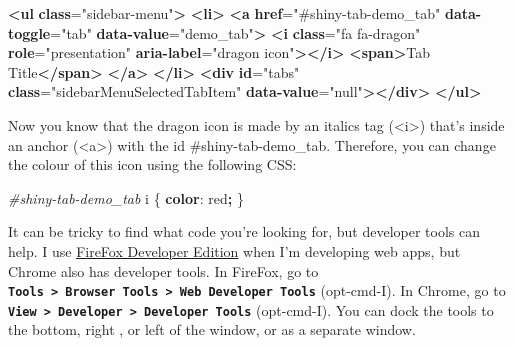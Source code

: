 \documentclass[
  oneside]{book}
\newenvironment{Shaded}{\begin{snugshade}}{\end{snugshade}}
\newcommand{\ConstantTok}[1]{\textcolor[rgb]{0.00,0.00,0.00}{#1}}
\newcommand{\ErrorTok}[1]{\textcolor[rgb]{0.64,0.00,0.00}{\textbf{#1}}}
\newcommand{\KeywordTok}[1]{\textcolor[rgb]{0.13,0.29,0.53}{\textbf{#1}}}
\newcommand{\NormalTok}[1]{#1}
\newcommand{\OperatorTok}[1]{\textcolor[rgb]{0.81,0.36,0.00}{\textbf{#1}}}
\newcommand{\OtherTok}[1]{\textcolor[rgb]{0.56,0.35,0.01}{#1}}
\newcommand{\PreprocessorTok}[1]{\textcolor[rgb]{0.56,0.35,0.01}{\textit{#1}}}
\newcommand{\StringTok}[1]{\textcolor[rgb]{0.31,0.60,0.02}{#1}}
\begin{document}
\begin{Shaded}
\begin{Highlighting}[]
\KeywordTok{\textless{}ul} \ErrorTok{class}\OtherTok{=}\StringTok{"sidebar{-}menu"}\KeywordTok{\textgreater{}}
  \KeywordTok{\textless{}li\textgreater{}}
    \KeywordTok{\textless{}a} \ErrorTok{href}\OtherTok{=}\StringTok{"\#shiny{-}tab{-}demo\_tab"} \ErrorTok{data{-}toggle}\OtherTok{=}\StringTok{"tab"} \ErrorTok{data{-}value}\OtherTok{=}\StringTok{"demo\_tab"}\KeywordTok{\textgreater{}}
      \KeywordTok{\textless{}i} \ErrorTok{class}\OtherTok{=}\StringTok{"fa fa{-}dragon"} \ErrorTok{role}\OtherTok{=}\StringTok{"presentation"} \ErrorTok{aria{-}label}\OtherTok{=}\StringTok{"dragon icon"}\KeywordTok{\textgreater{}\textless{}/i\textgreater{}}
      \KeywordTok{\textless{}span\textgreater{}}\NormalTok{Tab Title}\KeywordTok{\textless{}/span\textgreater{}}
    \KeywordTok{\textless{}/a\textgreater{}}
  \KeywordTok{\textless{}/li\textgreater{}}
  \KeywordTok{\textless{}div} \ErrorTok{id}\OtherTok{=}\StringTok{"tabs"} \ErrorTok{class}\OtherTok{=}\StringTok{"sidebarMenuSelectedTabItem"} \ErrorTok{data{-}value}\OtherTok{=}\StringTok{"null"}\KeywordTok{\textgreater{}\textless{}/div\textgreater{}}
\KeywordTok{\textless{}/ul\textgreater{}}
\end{Highlighting}
\end{Shaded}

Now you know that the dragon icon is made by an italics tag (\NormalTok{<i>}) that's inside an anchor (\NormalTok{<a>}) with the \NormalTok{id} \NormalTok{\#shiny-tab-demo\_tab}. Therefore, you can change the colour of this icon using the following CSS:

\begin{Shaded}
\begin{Highlighting}[]
\PreprocessorTok{\#shiny{-}tab{-}demo\_tab}\NormalTok{ i \{ }\KeywordTok{color}\NormalTok{: }\ConstantTok{red}\OperatorTok{;}\NormalTok{ \}}
\end{Highlighting}
\end{Shaded}

It can be tricky to find what code you're looking for, but developer tools can help. I use \href{https://www.mozilla.org/en-US/firefox/developer/}{FireFox Developer Edition} when I'm developing web apps, but Chrome also has developer tools. In FireFox, go to \textbf{\texttt{Tools\ \textgreater{}\ Browser\ Tools\ \textgreater{}\ Web\ Developer\ Tools}} (opt-cmd-I). In Chrome, go to \textbf{\texttt{View\ \textgreater{}\ Developer\ \textgreater{}\ Developer\ Tools}} (opt-cmd-I). You can dock the tools to the bottom, right , or left of the window, or as a separate window.
\end{document}
